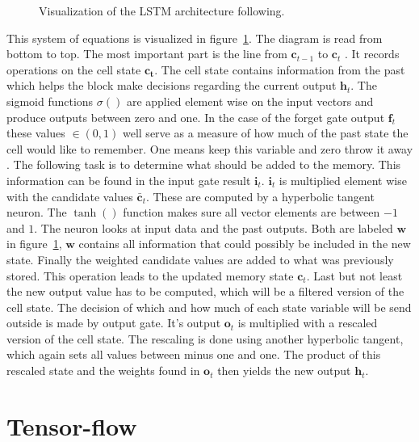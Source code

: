 \begin{figure}

\caption{Visualization of the LSTM architecture following.}
\label{fig:lstm}
\end{figure}
This system of equations is visualized in figure~\ref{fig:lstm}. The diagram is read from bottom to top. The most important part is the line from $\mathbf{c}_{t-1}$ to $\mathbf{c}_{t}$ \cite{Colah2015}. It records operations on the cell state $\mathbf{c_t}$. The cell state contains information from the past which helps the block make decisions regarding the current output $\mathbf{h}_t$. The sigmoid functions $\sigma()$ are applied element wise on the input vectors and produce outputs between zero and one. In the case of the forget gate output $\mathbf{f}_t$ these values $\in (0,1)$ well serve as a measure of how much of the past state the cell would like to remember. One means keep this variable and zero throw it away \cite{Colah2015}. 
The following task is to determine what should be added to the memory. This information can be found in the input gate result $\mathbf{i}_t$. $\mathbf{i}_t$ is multiplied element wise with the candidate values $\mathbf{\bar{c}}_t$. These are computed by a hyperbolic tangent neuron.  The $\tanh()$ function makes sure all vector elements are between $-1$ and $1$. The neuron looks at input data and the past outputs. Both are labeled $\mathbf{w}$ in figure~\ref{fig:lstm}, $\mathbf{w}$ contains all information that could possibly be included in the new state. Finally the weighted candidate values are added to what was previously stored. This operation leads to the updated memory state $\mathbf{c}_t$. 
Last but not least the new output value has to be computed, which will be a filtered version of the cell state. The decision of which and how much of each state variable will be send outside is made by output gate. It's output $\mathbf{o}_t$ is multiplied with a rescaled version of the cell state. The rescaling is done using another hyperbolic tangent, which again sets all values between minus one and one. The product of this rescaled state and the weights found in $\mathbf{o}_t$ then yields the new output $\mathbf{h}_t$. 

\section{Tensor-flow}


